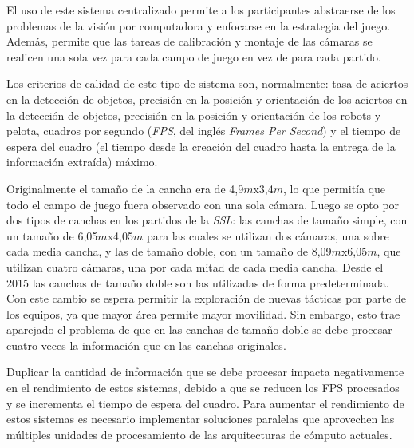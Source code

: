 El uso de este sistema centralizado permite a los participantes abstraerse de
los problemas de la visión por computadora y enfocarse en la estrategia del
juego. Además, permite que las tareas de calibración y montaje de las cámaras se
realicen una sola vez para cada campo de juego en vez de para cada partido.

Los criterios de calidad de este tipo de sistema son, normalmente: tasa de
aciertos en la detección de objetos, precisión en la posición y orientación de
los aciertos en la detección de objetos, precisión en la posición y orientación
de los robots y pelota, cuadros por segundo (\emph{FPS}, del inglés \emph{Frames
Per Second}) y el tiempo de espera del cuadro (el tiempo desde la creación del
cuadro hasta la entrega de la información extraída) máximo.

Originalmente el tamaño de la cancha era de 4,9$m$x3,4$m$, lo que permitía que
todo el campo de juego fuera observado con una sola cámara. Luego se opto por
dos tipos de canchas en los partidos de la \emph{SSL}: las canchas de tamaño
simple, con un tamaño de 6,05$m$x4,05$m$ para las cuales se utilizan dos
cámaras, una sobre cada media cancha, y las de tamaño doble, con un tamaño de
8,09$m$x6,05$m$, que utilizan cuatro cámaras, una por cada mitad de cada media
cancha. Desde el 2015 las canchas de tamaño doble son las utilizadas de forma
predeterminada\cite{sslrules2015}. Con este cambio se espera permitir la
exploración de nuevas tácticas por parte de los equipos, ya que mayor área
permite mayor movilidad. Sin embargo, esto trae aparejado el problema de que en
las canchas de tamaño doble se debe procesar cuatro veces la información que en
las canchas originales.

Duplicar la cantidad de información que se debe procesar impacta negativamente
en el rendimiento de estos sistemas, debido a que se reducen los FPS procesados
y se incrementa el tiempo de espera del cuadro. Para aumentar el rendimiento de
estos sistemas es necesario implementar soluciones paralelas que aprovechen las
múltiples unidades de procesamiento de las arquitecturas de cómputo actuales.
